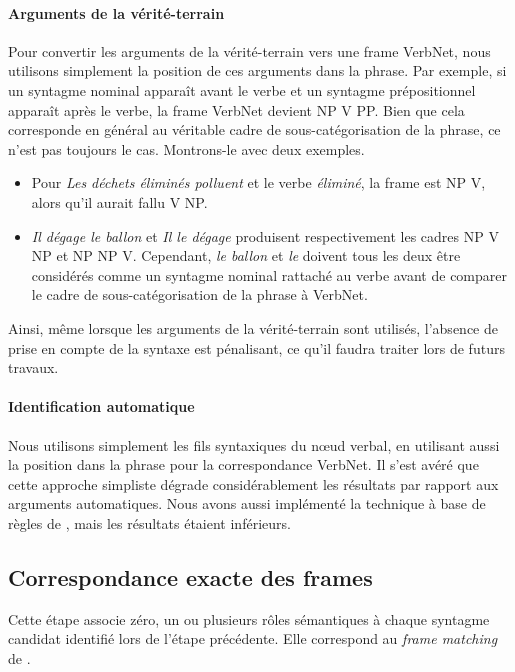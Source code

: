 \paragraph{Arguments de la vérité-terrain}

Pour convertir les arguments de la vérité-terrain vers une frame VerbNet, nous
utilisons simplement la position de ces arguments dans la phrase. Par exemple,
si un syntagme nominal apparaît avant le verbe et un syntagme prépositionnel
apparaît après le verbe, la frame VerbNet devient NP V PP. Bien que cela
corresponde en général au véritable cadre de sous-catégorisation de la phrase,
ce n'est pas toujours le cas. Montrons-le avec deux exemples.

\begin{itemize}
    \item Pour \textit{Les déchets éliminés polluent} et le verbe
        \textit{éliminé}, la frame est NP V, alors qu'il aurait fallu V NP.
    \item \textit{Il dégage le ballon} et \textit{Il le dégage} produisent
        respectivement les cadres NP V NP et NP NP V. Cependant, \textit{le
        ballon} et \textit{le} doivent tous les deux être considérés comme un
        syntagme nominal rattaché au verbe avant de comparer le cadre de
        sous-catégorisation de la phrase à VerbNet.
\end{itemize}

Ainsi, même lorsque les arguments de la vérité-terrain sont utilisés, l'absence
de prise en compte de la syntaxe est pénalisant, ce qu'il faudra traiter lors
de futurs travaux.

\paragraph{Identification automatique} Nous utilisons simplement les fils
syntaxiques du nœud verbal, en utilisant aussi la position dans la phrase pour
la correspondance VerbNet. Il s'est avéré que cette approche simpliste dégrade
considérablement les résultats par rapport aux arguments automatiques. Nous
avons aussi implémenté la technique à base de règles de
\citep{lang2011unsupervised}, mais les résultats étaient inférieurs. 

\subsection{Correspondance exacte des frames}
\label{correspondance_exacte}

Cette étape associe zéro, un ou plusieurs rôles sémantiques à chaque syntagme
candidat identifié lors de l'étape précédente. Elle correspond au \textit{frame
matching} de \citet{swier2005exploiting}.

